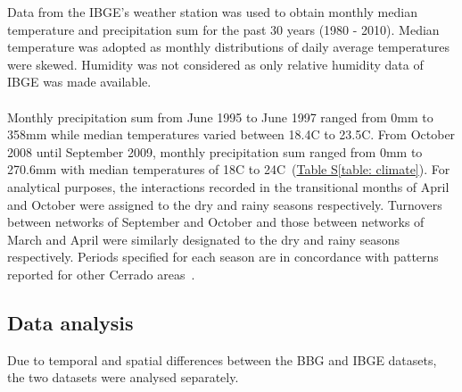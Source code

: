 \documentclass[11pt]{article}
\begin{document}
Data from the IBGE's weather station was used to obtain monthly median temperature and precipitation sum for the past 30 years (1980 - 2010). Median temperature was adopted as monthly distributions of daily average temperatures were skewed. Humidity was not considered as only relative humidity data of IBGE was made available.\\
\\
Monthly precipitation sum from June 1995 to June 1997 ranged from 0mm to 358mm while median temperatures varied between 18.4\degree C to 23.5\degree C. From October 2008 until September 2009, monthly precipitation sum ranged from 0mm to 270.6mm with median temperatures of 18\degree C to 24\degree C~(\hyperref[table: climate]{Table S\ref{table: climate}}). For analytical purposes, the interactions recorded in the transitional months of April and October were assigned to the dry and rainy seasons respectively. Turnovers between networks of September and October and those between networks of March and April were similarly designated to the dry and rainy seasons respectively. Periods specified for each season are in concordance with patterns reported for other Cerrado areas~\citep{Gottsberger2006a}. 

\subsection{Data analysis}
Due to temporal and spatial differences between the BBG and IBGE datasets, the two datasets were analysed separately. 
\end{document}
